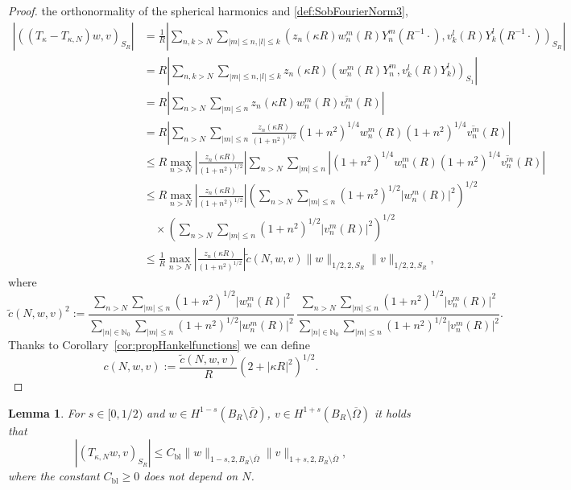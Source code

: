 \documentclass[12pt,DIV=14]{scrartcl}
\newtheorem{lemma}[definition]{Lemma}
\providecommand{\N}{\mathbb{N}}
\providecommand{\Om}{\Omega}
\begin{document}
\begin{proof}
the orthonormality of the spherical harmonics \cite[Thm.~2.8]{Colton:19}
and \eqref{def:SobFourierNorm3},
\begin{align*}
\left|\left((T_\kappa - T_{\kappa,N}) w,v\right)_{S_R}\right|
&= \frac{1}{R}\left|\sum_{n,k> N}\sum_{|m|\le n,|l|\le k}
\left(z_n(\kappa R)w_n^m(R)Y_n^m(R^{-1}\cdot),v_k^l(R)Y_k^l(R^{-1}\cdot)\right)_{S_R}\right|\\
&= R\left|\sum_{n,k> N}\sum_{|m|\le n,|l|\le k}
z_n(\kappa R)\left(w_n^m(R)Y_n^m,v_k^l(R)Y_k^l)\right)_{S_1}\right|\\
&= R\left|\sum_{n> N}\sum_{|m|\le n}
z_n(\kappa R) w_n^m(R)\overline{v_n^m}(R)\right|\\
&= R\left|\sum_{n> N}\sum_{|m|\le n}
\frac{z_n(\kappa R)}{(1+n^2)^{1/2}}(1+n^2)^{1/4}w_n^m(R)(1+n^2)^{1/4}\overline{v_n^m}(R)\right|\\
&\le R\max_{n> N}
\left|\frac{z_n(\kappa R)}{(1+n^2)^{1/2}}\right|
\sum_{n> N}\sum_{|m|\le n}\left|(1+n^2)^{1/4}w_n^m(R)(1+n^2)^{1/4}\overline{v_n^m}(R)\right|\\
&\le R\max_{n> N}
\left|\frac{z_n(\kappa R)}{(1+n^2)^{1/2}}\right|
\left(\sum_{n> N}\sum_{|m|\le n}(1+n^2)^{1/2}\left|w_n^m(R)\right|^2\right)^{1/2}\\
&\quad \times
\left(\sum_{n> N}\sum_{|m|\le n}(1+n^2)^{1/2}\left|v_n^m(R)\right|^2\right)^{1/2}\\
&\le \frac{1}{R}\max_{n> N}
\left|\frac{z_n(\kappa R)}{(1+n^2)^{1/2}}\right|\tilde{c}(N,w,v)\|w\|_{1/2,2,S_R}\|v\|_{1/2,2,S_R},
\end{align*}
where
\[
\tilde{c}(N,w,v)^2
:=\frac{\sum_{n> N}\sum_{|m|\le n}(1+n^2)^{1/2}\left|w_n^m(R)\right|^2}%
{\sum_{|n|\in\N_0}\sum_{|m|\le n}(1+n^2)^{1/2}\left|w_n^m(R)\right|^2}
\,\frac{\sum_{n> N}\sum_{|m|\le n}(1+n^2)^{1/2}\left|v_n^m(R)\right|^2}%
{\sum_{|n|\in\N_0}\sum_{|m|\le n}(1+n^2)^{1/2}\left|v_n^m(R)\right|^2}.
\]
Thanks to Corollary~\ref{cor:propHankelfunctions} we can define
\[
c(N,w,v) := \frac{\tilde{c}(N,w,v)}{R}\left(2 + |\kappa R|^2\right)^{1/2}.
\]
\end{proof}
\begin{lemma}\label{l:Tkuniformcontinuity}
For $s\in[0,1/2)$ and $w\in H^{1-s}(B_R\setminus\overline\Om)$,
$v\in H^{1+s}(B_R\setminus\overline\Om)$ it holds that
\[
\left|(T_{\kappa,N} w,v)_{S_R}\right|
\le C_\mathrm{bl}\|w\|_{1-s,2,B_R\setminus\overline\Om}\|v\|_{1+s,2,B_R\setminus\overline\Om},
\]
where the constant $C_\mathrm{bl}\ge 0$ does not depend on $N$.
\end{lemma}
\end{document}
